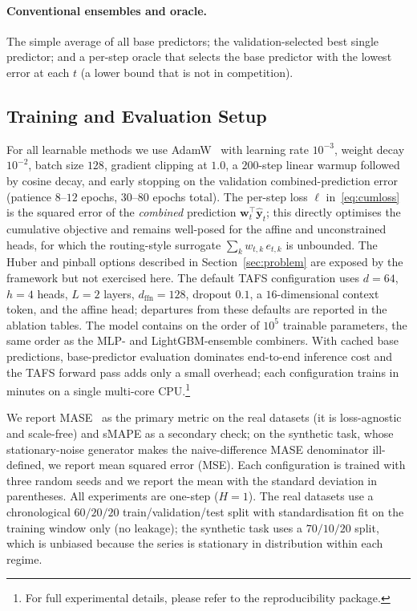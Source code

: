 \documentclass[journal]{IEEEtran}
\begin{document}
\paragraph*{Conventional ensembles and oracle.} The simple average of all base predictors; the validation-selected best single predictor; and a per-step oracle that selects the base predictor with the lowest error at each $t$ (a lower bound that is not in competition).

\subsection{Training and Evaluation Setup}

For all learnable methods we use AdamW~\cite{loshchilov2019adamw} with learning rate $10^{-3}$, weight decay $10^{-2}$, batch size $128$, gradient clipping at $1.0$, a $200$-step linear warmup followed by cosine decay, and early stopping on the validation combined-prediction error (patience $8$--$12$ epochs, $30$--$80$ epochs total). The per-step loss $\ell$ in~\eqref{eq:cumloss} is the squared error of the \emph{combined} prediction $\mathbf{w}_t^{\!\top}\hat{\mathbf y}_t$; this directly optimises the cumulative objective and remains well-posed for the affine and unconstrained heads, for which the routing-style surrogate $\sum_k w_{t,k}\,e_{t,k}$ is unbounded. The Huber and pinball options described in Section~\ref{sec:problem} are exposed by the framework but not exercised here. The default TAFS configuration uses $d{=}64$, $h{=}4$ heads, $L{=}2$ layers, $d_{\mathrm{ffn}}{=}128$, dropout $0.1$, a $16$-dimensional context token, and the affine head; departures from these defaults are reported in the ablation tables. The model contains on the order of $10^{5}$ trainable parameters, the same order as the MLP- and LightGBM-ensemble combiners. With cached base predictions, base-predictor evaluation dominates end-to-end inference cost and the TAFS forward pass adds only a small overhead; each configuration trains in minutes on a single multi-core CPU.\footnote{For full experimental details, please refer to the reproducibility package.}

We report MASE~\cite{hyndman2006mase} as the primary metric on the real datasets (it is loss-agnostic and scale-free) and sMAPE as a secondary check; on the synthetic task, whose stationary-noise generator makes the naive-difference MASE denominator ill-defined, we report mean squared error (MSE). Each configuration is trained with three random seeds and we report the mean with the standard deviation in parentheses. All experiments are one-step ($H{=}1$). The real datasets use a chronological $60/20/20$ train/validation/test split with standardisation fit on the training window only (no leakage); the synthetic task uses a $70/10/20$ split, which is unbiased because the series is stationary in distribution within each regime.
\end{document}
